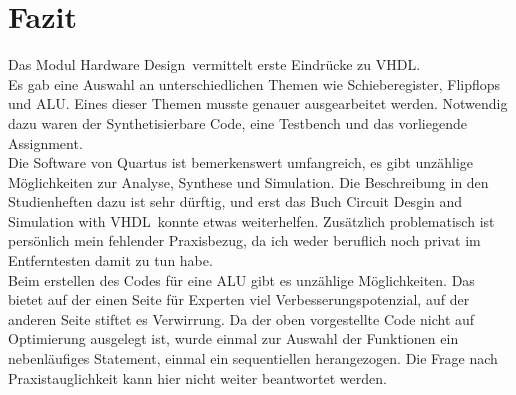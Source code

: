 \documentclass[12pt,a4paper]{scrartcl}	%
\begin{document}
\section{Fazit}
Das Modul \glqq Hardware Design\grqq~vermittelt erste Eindrücke zu VHDL.\\
Es gab eine Auswahl an unterschiedlichen Themen wie Schieberegister, Flipflops und ALU. Eines dieser Themen musste genauer ausgearbeitet werden. Notwendig dazu waren der Synthetisierbare Code, eine Testbench und das vorliegende Assignment.\\
Die Software von Quartus ist bemerkenswert umfangreich, es gibt unzählige Möglichkeiten zur Analyse, Synthese und Simulation. Die Beschreibung in den Studienheften dazu ist sehr dürftig, und erst das Buch \glqq Circuit Desgin and Simulation with VHDL\grqq~konnte etwas weiterhelfen. Zusätzlich problematisch ist persönlich mein fehlender Praxisbezug, da ich weder beruflich noch privat im Entferntesten damit zu tun habe.\\
Beim erstellen des Codes für eine ALU gibt es unzählige Möglichkeiten. Das bietet auf der einen Seite für Experten viel Verbesserungspotenzial, auf der anderen Seite stiftet es Verwirrung. Da der oben vorgestellte Code nicht auf Optimierung ausgelegt ist, wurde einmal zur Auswahl der Funktionen ein nebenläufiges Statement, einmal ein sequentiellen herangezogen. Die Frage nach Praxistauglichkeit kann hier nicht weiter beantwortet werden.\\

\newpage

\printbibliography
\end{document}
